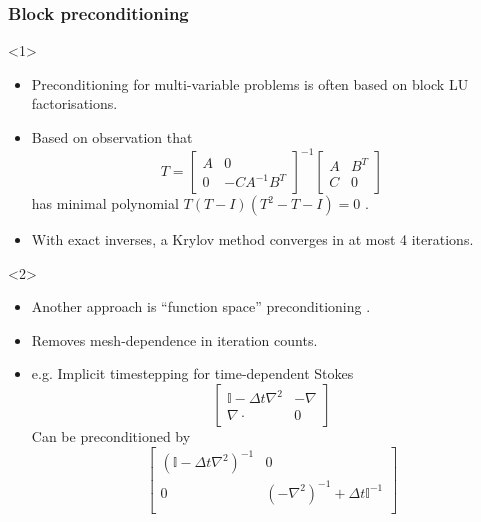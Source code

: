 \documentclass[presentation]{beamer}
\begin{document}
\begin{frame}
  \frametitle{Block preconditioning}
  \begin{onlyenv}<1>
    \begin{itemize}
    \item Preconditioning for multi-variable problems is
      often based on block LU factorisations.
    \item Based on observation that
      \begin{equation*}
        T = \begin{bmatrix}
          A & 0 \\
          0 & - C A^{-1} B^T
        \end{bmatrix}^{-1}
        \begin{bmatrix}
          A & B^T \\
          C & 0
        \end{bmatrix}
      \end{equation*}
      has minimal polynomial $T(T - I)(T^2 - T - I) = 0$
      \parencite{Murphy:2000}.  
    \item With exact inverses, a Krylov method converges in at most 4 iterations.
    \end{itemize}
  \end{onlyenv}
  \begin{onlyenv}<2>
    \begin{itemize}
    \item Another approach is ``function space'' preconditioning
      \parencite{Kirby:2010,Mardal:2011,Malek:2014}.
    \item Removes mesh-dependence in iteration counts.
    \item e.g. Implicit timestepping for time-dependent Stokes
    \begin{equation*}
      \begin{bmatrix}
        \mathbb{I} - \Delta t \nabla^2 & -\nabla \\
        \nabla\cdot & 0
      \end{bmatrix}
    \end{equation*}
    Can be preconditioned by
    \begin{equation*}
      \begin{bmatrix}
        (\mathbb{I} - \Delta t\nabla^2)^{-1} & 0 \\
          0 & (-\nabla^2)^{-1} + \Delta t \mathbb{I}^{-1} \\
        \end{bmatrix}
      \end{equation*}
    \end{itemize}
  \end{onlyenv}
\end{frame}
\end{document}
